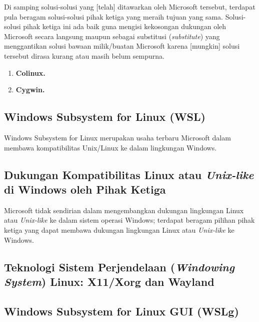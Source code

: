 

Di samping solusi-solusi yang [telah] ditawarkan oleh Microsoft tersebut, terdapat pula beragam solusi-solusi pihak ketiga yang meraih tujuan yang sama. Solusi-solusi pihak ketiga ini ada baik guna mengisi kekosongan dukungan oleh Microsoft secara langsung maupun sebagai substitusi (\textit{substitute}) yang menggantikan solusi bawaan milik/buatan Microsoft karena [mungkin] solusi tersebut dirasa kurang atau masih belum sempurna.

\begin{enumerate}
    \item \textbf{Colinux.}

    \item \textbf{Cygwin.}
\end{enumerate}

\subsection{Windows Subsystem for Linux (WSL)}

Windows Subsystem for Linux merupakan usaha terbaru Microsoft dalam membawa kompatibilitas Unix/Linux ke dalam lingkungan Windows.

\subsection{Dukungan Kompatibilitas Linux atau \textit{Unix-like} di Windows oleh Pihak Ketiga}

Microsoft tidak sendirian dalam mengembangkan dukungan lingkungan Linux atau \textit{Unix-like} ke dalam sistem operasi Windows; terdapat beragam pilihan pihak ketiga yang dapat membawa dukungan lingkungan Linux atau \textit{Unix-like} ke Windows.

\subsection{Teknologi Sistem Perjendelaan (\textit{Windowing System}) Linux: X11/Xorg dan Wayland}

\subsection{Windows Subsystem for Linux GUI (WSLg)}

